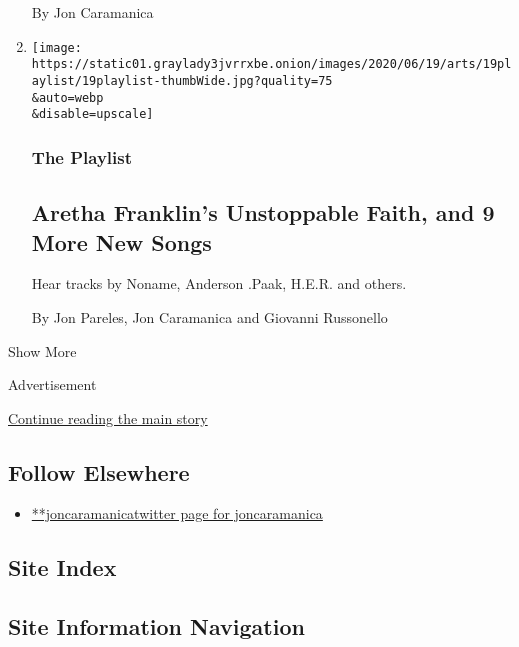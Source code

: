 \begin{enumerate}
  By Jon Caramanica
\item
  \href{/2020/06/19/arts/music/playlist-noname-aretha-franklin-saweetie.html}{}

  \texttt{[image: https://static01.graylady3jvrrxbe.onion/images/2020/06/19/arts/19playlist/19playlist-thumbWide.jpg?quality=75\\\&auto=webp\\\&disable=upscale]}

  \hypertarget{the-playlist-5}{%
  \subsubsection{The Playlist}\label{the-playlist-5}}

  \hypertarget{aretha-franklins-unstoppable-faith-and-9-more-new-songs}{%
  \subsection{Aretha Franklin's Unstoppable Faith, and 9 More New
  Songs}\label{aretha-franklins-unstoppable-faith-and-9-more-new-songs}}

  Hear tracks by Noname, Anderson .Paak, H.E.R. and others.

  By Jon Pareles, Jon Caramanica and Giovanni Russonello
\end{enumerate}

Show More

Advertisement

\protect\hyperlink{after-mid2}{Continue reading the main story}

\hypertarget{follow-elsewhere}{%
\subsection{Follow Elsewhere}\label{follow-elsewhere}}

\begin{itemize}
\tightlist
\item
  \href{https://twitter.com/joncaramanica}{**joncaramanicatwitter page
  for joncaramanica}
\end{itemize}

\hypertarget{site-index}{%
\subsection{Site Index}\label{site-index}}

\hypertarget{site-information-navigation}{%
\subsection{Site Information
Navigation}\label{site-information-navigation}}

